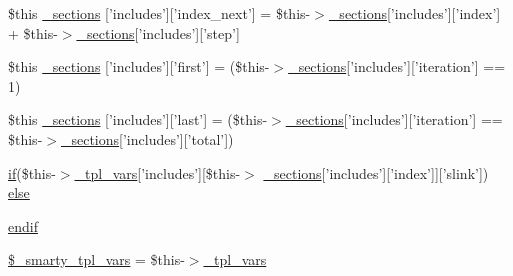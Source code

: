 \begin{DoxyCompactItemize}
\item 
\$this \hyperlink{default_234d6fa4bfd5eef6424a9ddc74a166350_2_06_06176_05_06_061767056382_05include_8tpl_8php_a12a0b78e177915fb4c6e0fe1e63d0a56}{\-\_\-sections} \mbox{[}'includes'\mbox{]}\mbox{[}'index\-\_\-next'\mbox{]} = \$this-\/$>$\hyperlink{_06_06127_05_06_0612781687_05pkgelementindex_8tpl_8php_a9e3d26b39edfe29c3f29b8035ef33828}{\-\_\-sections}\mbox{[}'includes'\mbox{]}\mbox{[}'index'\mbox{]} + \$this-\/$>$\hyperlink{_06_06127_05_06_0612781687_05pkgelementindex_8tpl_8php_a9e3d26b39edfe29c3f29b8035ef33828}{\-\_\-sections}\mbox{[}'includes'\mbox{]}\mbox{[}'step'\mbox{]}
\item 
\$this \hyperlink{default_234d6fa4bfd5eef6424a9ddc74a166350_2_06_06176_05_06_061767056382_05include_8tpl_8php_ae13052e9adab8b032ebf4a853a45daef}{\-\_\-sections} \mbox{[}'includes'\mbox{]}\mbox{[}'first'\mbox{]} = (\$this-\/$>$\hyperlink{_06_06127_05_06_0612781687_05pkgelementindex_8tpl_8php_a9e3d26b39edfe29c3f29b8035ef33828}{\-\_\-sections}\mbox{[}'includes'\mbox{]}\mbox{[}'iteration'\mbox{]} == 1)
\item 
\$this \hyperlink{default_234d6fa4bfd5eef6424a9ddc74a166350_2_06_06176_05_06_061767056382_05include_8tpl_8php_a8b4d7452d309e652903a1ef03f48f045}{\-\_\-sections} \mbox{[}'includes'\mbox{]}\mbox{[}'last'\mbox{]} = (\$this-\/$>$\hyperlink{_06_06127_05_06_0612781687_05pkgelementindex_8tpl_8php_a9e3d26b39edfe29c3f29b8035ef33828}{\-\_\-sections}\mbox{[}'includes'\mbox{]}\mbox{[}'iteration'\mbox{]} == \$this-\/$>$\hyperlink{_06_06127_05_06_0612781687_05pkgelementindex_8tpl_8php_a9e3d26b39edfe29c3f29b8035ef33828}{\-\_\-sections}\mbox{[}'includes'\mbox{]}\mbox{[}'total'\mbox{]})
\item 
\hyperlink{_setup_8inc_8php_ad0184337b31d13763ec8751feff4aabe}{if}(\$this-\/$>$\hyperlink{_06_06127_05_06_0612781687_05pkgelementindex_8tpl_8php_a4a4846d8e68d455590131a05697f67a3}{\-\_\-tpl\-\_\-vars}\mbox{[}'includes'\mbox{]}\mbox{[}\$this-\/$>$\*
\hyperlink{_06_06127_05_06_0612781687_05pkgelementindex_8tpl_8php_a9e3d26b39edfe29c3f29b8035ef33828}{\-\_\-sections}\mbox{[}'includes'\mbox{]}\mbox{[}'index'\mbox{]}\mbox{]}\mbox{[}'slink'\mbox{]}) \hyperlink{default_234d6fa4bfd5eef6424a9ddc74a166350_2_06_06176_05_06_061767056382_05include_8tpl_8php_a0fb34475c72dda38978dd1389cf315c8}{else}
\item 
\hyperlink{default_234d6fa4bfd5eef6424a9ddc74a166350_2_06_06176_05_06_061767056382_05include_8tpl_8php_a82cd33ca97ff99f2fcc5e9c81d65251b}{endif}
\item 
\hyperlink{default_234d6fa4bfd5eef6424a9ddc74a166350_2_06_06176_05_06_061767056382_05include_8tpl_8php_a14dde6d029d65a879ee7bc1ebc398dd1}{\$\-\_\-smarty\-\_\-tpl\-\_\-vars} = \$this-\/$>$\hyperlink{_06_06127_05_06_0612781687_05pkgelementindex_8tpl_8php_a4a4846d8e68d455590131a05697f67a3}{\-\_\-tpl\-\_\-vars}

\end{DoxyCompactItemize}
